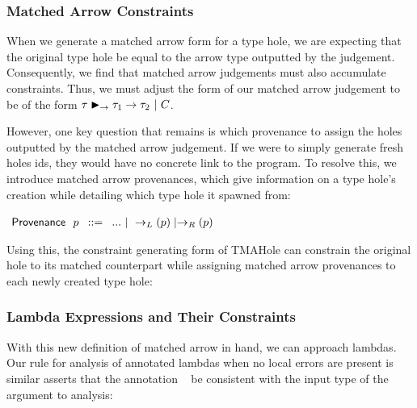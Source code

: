 \subsubsection{Matched Arrow Constraints}
When we generate a matched arrow form for a type hole, we are expecting that the original type hole be equal to the arrow type outputted by the judgement. Consequently, we find that matched arrow judgements must also accumulate constraints. Thus, we must adjust the form of our matched arrow judgement to be of the form $\matchedArrow{\TMV}{\TMV_1}{\TMV_2} ~|~ C$.

However, one key question that remains is which provenance to assign the holes outputted by the matched arrow judgement. If we were to simply generate fresh holes ids, they would have no concrete link to the program. To resolve this, we introduce matched arrow provenances, which give information on a type hole's creation while detailing which type hole it spawned from:
\begin{center}
    $\arraycolsep=4pt\begin{array}{lll}
    \Prov~~ p & ::= & 
        ... ~\vert~ 
        \rightarrow_L(\Provp) \mid \rightarrow_R(\Provp)
        \\
    \end{array}$
\end{center}

Using this, the constraint generating form of TMAHole can constrain the original hole to its matched counterpart while assigning matched arrow provenances to each newly created type hole:

\begin{mathpar}
\end{mathpar}

\subsubsection{Lambda Expressions and Their Constraints}
With this new definition of matched arrow in hand, we can approach lambdas. Our rule for analysis of annotated lambdas when no local errors are present is similar asserts that the annotation \TMV~ be consistent with the input type of the argument to analysis:

\begin{mathpar}
\end{mathpar}

